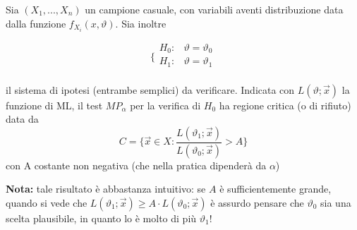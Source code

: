 \begin{lemma}
Sia $(X_1,...,X_n)$ un campione casuale, con variabili aventi distribuzione data dalla funzione $f_{X_i}(x, \vartheta)$.
Sia inoltre

$$\bigg \{
\begin{array}{rl}
H_0: & \vartheta = \vartheta_0 \\
H_1: & \vartheta = \vartheta_1 \\
\end{array}
$$

il sistema di ipotesi (entrambe semplici) da verificare. Indicata con $L(\vartheta;\vec{x})$ la funzione di ML, 
il test $MP_\alpha$ per la verifica di $H_0$ ha regione critica (o di rifiuto) data da
$$C = \{\vec{x} \in X : \frac{L(\vartheta_1;\vec{x})}{L(\vartheta_0;\vec{x})}>A\}$$
con A costante non negativa (che nella pratica dipenderà da $\alpha$)
\end{lemma}
\textbf{Nota:} tale risultato è abbastanza intuitivo: se $A$ è sufficientemente grande, 
quando si vede che $L(\vartheta_1;\vec{x}) \geq A \cdot L(\vartheta_0;\vec{x})$ 
è assurdo pensare che $\vartheta_0$ sia una scelta plausibile, in quanto lo è molto di più $\vartheta_1$!

